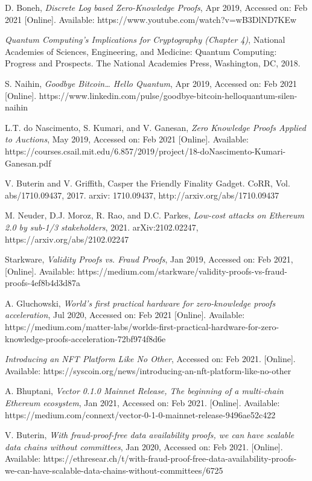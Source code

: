\documentclass[peerreview]{ieeesyscoin}
\begin{document}
\begin{thebibliography}{00}
 D. Boneh, \textit{Discrete Log based Zero-Knowledge Proofs}, Apr 2019,  Accessed on: Feb 2021 [Online].  Available: https://www.youtube.com/watch?v=wB3DlND7KEw

 \textit{Quantum Computing’s Implications for Cryptography (Chapter 4)}, National Academies of Sciences, Engineering, and Medicine: Quantum Computing: Progress and Prospects. The National Academies Press, Washington, DC, 2018.

 S. Naihin, \textit{Goodbye Bitcoin… Hello Quantum}, Apr 2019, Accessed on: Feb 2021 [Online].   https://www.linkedin.com/pulse/goodbye-bitcoin-helloquantum-silen-naihin

 L.T. do Nascimento, S. Kumari, and V. Ganesan, \textit{Zero Knowledge Proofs Applied to Auctions}, May 2019, Accessed on: Feb 2021 [Online].   Available: https://courses.csail.mit.edu/6.857/2019/project/18-doNascimento-Kumari-Ganesan.pdf

 V. Buterin and V. Griffith, Casper the Friendly Finality Gadget. CoRR, Vol. abs/1710.09437, 2017. arxiv: 1710.09437, http://arxiv.org/abs/1710.09437

 M. Neuder, D.J. Moroz, R. Rao, and D.C. Parkes, \textit{Low-cost attacks on Ethereum 2.0 by sub-1/3 stakeholders}, 2021. arXiv:2102.02247,  https://arxiv.org/abs/2102.02247

 Starkware, \textit{Validity Proofs vs. Fraud Proofs}, Jan 2019, Accessed on: Feb 2021, [Online]. Available: https://medium.com/starkware/validity-proofs-vs-fraud-proofs-4ef8b4d3d87a

 A. Gluchowski, \textit{World’s first practical hardware for zero-knowledge proofs acceleration}, Jul 2020, Accessed on: Feb 2021 [Online]. Available:  https://medium.com/matter-labs/worlds-first-practical-hardware-for-zero-knowledge-proofs-acceleration-72bf974f8d6e

  \textit{Introducing an NFT Platform Like No Other}, Accessed on: Feb 2021. [Online]. Available: https://syscoin.org/news/introducing-an-nft-platform-like-no-other

 A. Bhuptani, \textit{Vector 0.1.0 Mainnet Release, The beginning of a multi-chain Ethereum ecosystem}, Jan 2021, Accessed on: Feb 2021.  [Online]. Available:  https://medium.com/connext/vector-0-1-0-mainnet-release-9496ae52c422

  V. Buterin, \textit{With fraud-proof-free data availability proofs, we can have scalable data chains without committees}, Jan 2020, Accessed on: Feb 2021.  [Online]. Available:  https://ethresear.ch/t/with-fraud-proof-free-data-availability-proofs-we-can-have-scalable-data-chains-without-committees/6725


\end{thebibliography}
\end{document}

